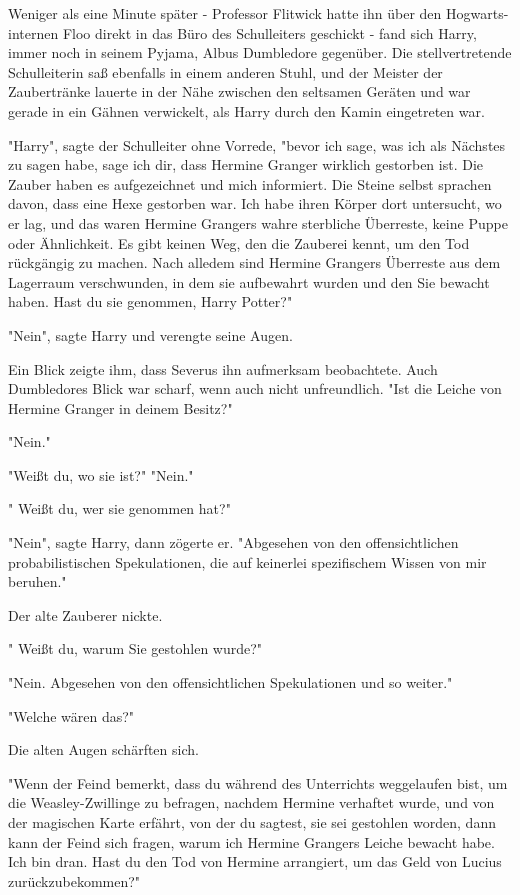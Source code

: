 {Weniger als eine Minute später - Professor Flitwick hatte ihn über den Hogwarts-internen Floo direkt in das Büro des Schulleiters geschickt - fand sich Harry, immer noch in seinem Pyjama, Albus Dumbledore gegenüber. Die stellvertretende Schulleiterin saß ebenfalls in einem anderen Stuhl, und der Meister der Zaubertränke lauerte in der Nähe zwischen den seltsamen Geräten und war gerade in ein Gähnen verwickelt, als Harry durch den Kamin eingetreten war.

"Harry", sagte der Schulleiter ohne Vorrede, "bevor ich sage, was ich als Nächstes zu sagen habe, sage ich dir, dass Hermine Granger wirklich gestorben ist. Die Zauber haben es aufgezeichnet und mich informiert. Die Steine selbst sprachen davon, dass eine Hexe gestorben war. Ich habe ihren Körper dort untersucht, wo er lag, und das waren Hermine Grangers wahre sterbliche Überreste, keine Puppe oder Ähnlichkeit. Es gibt keinen Weg, den die Zauberei kennt, um den Tod rückgängig zu machen. Nach alledem sind Hermine Grangers Überreste aus dem Lagerraum verschwunden, in dem sie aufbewahrt wurden und den Sie bewacht haben. Hast du sie genommen, Harry Potter?"

"Nein", sagte Harry und verengte seine Augen.

Ein Blick zeigte ihm, dass Severus ihn aufmerksam beobachtete. Auch Dumbledores Blick war scharf, wenn auch nicht unfreundlich. "Ist die Leiche von Hermine Granger in deinem Besitz?"

"Nein."

"Weißt du, wo sie ist?" "Nein."

" Weißt du, wer sie genommen hat?"

"Nein", sagte Harry, dann zögerte er. "Abgesehen von den offensichtlichen probabilistischen Spekulationen, die auf keinerlei spezifischem Wissen von mir beruhen."

Der alte Zauberer nickte.

" Weißt du, warum Sie gestohlen wurde?"

"Nein. Abgesehen von den offensichtlichen Spekulationen und so weiter."

"Welche wären das?"

Die alten Augen schärften sich.

"Wenn der Feind bemerkt, dass du während des Unterrichts weggelaufen bist, um die Weasley-Zwillinge zu befragen, nachdem Hermine verhaftet wurde, und von der magischen Karte erfährt, von der du sagtest, sie sei gestohlen worden, dann kann der Feind sich fragen, warum ich Hermine Grangers Leiche bewacht habe. Ich bin dran. Hast du den Tod von Hermine arrangiert, um das Geld von Lucius zurückzubekommen?"

}
